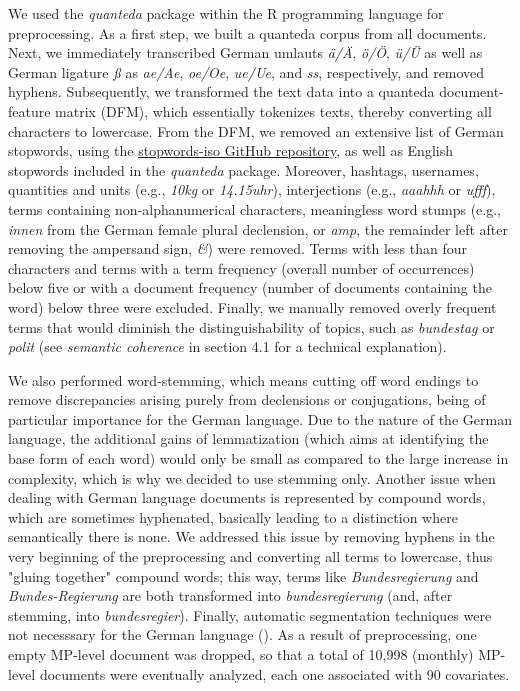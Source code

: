 \documentclass[12pt]{article}
\begin{document}
We used the \textit{quanteda} package within the R programming language for preprocessing. As a first step, we built a quanteda corpus from all documents. Next, we immediately transcribed German umlauts \textit{ä/Ä}, \textit{ö/Ö}, \textit{ü/Ü} as well as German ligature \textit{ß} as \textit{ae/Ae}, \textit{oe/Oe}, \textit{ue/Ue}, and \textit{ss}, respectively, and removed hyphens. Subsequently, we transformed the text data into a quanteda document-feature matrix (DFM), which essentially tokenizes texts, thereby converting all characters to lowercase. From the DFM, we removed an extensive list of German stopwords, using the \href{https://github.com/stopwords-iso/stopwords-iso}{stopwords-iso GitHub repository}, as well as English stopwords included in the \textit{quanteda} package. Moreover, hashtags, usernames, quantities and units (e.g., \textit{10kg} or \textit{14.15uhr}), interjections (e.g., \textit{aaahhh} or \textit{ufff}), terms containing non-alphanumerical characters, meaningless word stumps (e.g., \textit{innen} from the German female plural declension, or \textit{amp}, the remainder left after removing the ampersand sign, \textit{\&}) were removed. Terms with less than four characters and terms with a term frequency (overall number of occurrences) below five or with a document frequency (number of documents containing the word) below three were excluded. Finally, we manually removed overly frequent terms that would diminish the distinguishability of topics, such as \textit{bundestag} or \textit{polit} (see \textit{semantic coherence} in section 4.1 for a technical explanation).

We also performed word-stemming, which means cutting off word endings to remove discrepancies arising purely from declensions or conjugations, being of particular importance for the German language. Due to the nature of the German language, the additional gains of lemmatization (which aims at identifying the base form of each word) would only be small as compared to the large increase in complexity, which is why we decided to use stemming only. Another issue when dealing with German language documents is represented by compound words, which are sometimes hyphenated, basically leading to a distinction where semantically there is none. We addressed this issue by removing hyphens in the very beginning of the preprocessing and converting all terms to lowercase, thus "gluing together" compound words; this way, terms like \textit{Bundesregierung} and \textit{Bundes-Regierung} are both transformed into \textit{bundesregierung} (and, after stemming, into \textit{bundesregier}). Finally, automatic segmentation techniques were not necesssary for the German language (\citealp{lucas2015computer}). As a result of preprocessing, one empty MP-level document was dropped, so that a total of 10,998 (monthly) MP-level documents were eventually analyzed, each one associated with 90 covariates.




\end{document}
